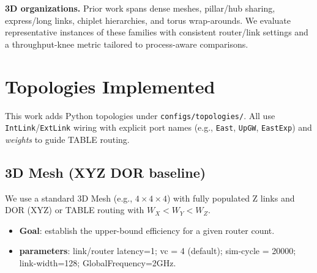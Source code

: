 \documentclass[11pt]{article}
\begin{document}
\textbf{3D organizations.} Prior work spans dense meshes, pillar/hub sharing,
express/long links, chiplet hierarchies, and torus wrap-arounds. We evaluate
representative instances of these families with consistent router/link settings
and a throughput-knee metric tailored to process-aware comparisons.

\section{Topologies Implemented}
This work adds Python topologies under \texttt{configs/topologies/}. All use \texttt{IntLink}/\texttt{ExtLink} wiring with explicit port names (e.g., \texttt{East}, \texttt{UpGW}, \texttt{EastExp}) and \emph{weights} to guide TABLE routing.

\subsection{3D Mesh (XYZ DOR baseline)}
\label{sec:mesh3d}
We use a standard 3D Mesh (e.g., $4{\times}4{\times}4$) with fully populated Z links and DOR (XYZ) or TABLE routing with $W_X < W_Y < W_Z$.
\begin{itemize}[leftmargin=1em]
  \item \textbf{Goal}: establish the upper-bound efficiency for a given router count.
  \item \textbf{parameters}: link/router latency=1; vc = 4 (default); sim-cycle = 20000; link-width=128; GlobalFrequency=2GHz.
\end{itemize}
\end{document}
